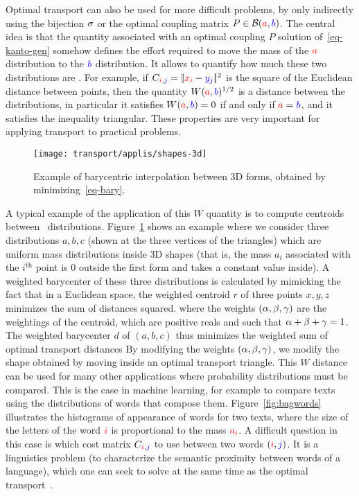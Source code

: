 Optimal transport can also be used for more difficult problems, by only indirectly using the bijection $\sigma$ or the optimal coupling matrix $P \in \mathcal{B}({\color{red}a},{\color{blue}b})$. The central idea is that the quantity associated with an optimal coupling $P$ solution of~\eqref{eq-kanto-gen}
somehow defines the effort required to move the mass of the ${\color{red}a}$ distribution to the ${\color{blue}b}$ distribution. It allows to quantify how much these two distributions are . For example, if $C_{{\color{red}i},{\color{blue}j}} = |\!| {\color{red}x_i} - {\color{blue}y_j} |\!|^2$ is the square of the Euclidean distance between points, then the quantity $W ({\color{red}a}, {\color{blue}b})^{1/2}$ is a distance between the distributions, in particular it satisfies $W({\color{red}a}, {\color{blue}b}) = 0$ if and only if ${\color{red}a} = {\color{blue}b}$, and it satisfies the inequality triangular. These properties are very important for applying transport to practical problems.


\begin{figure}\centering
        \texttt{[image: transport/applis/shapes-3d]}
    \caption{\label{fig:barycenters} Example of barycentric interpolation between 3D forms, obtained by minimizing~\eqref{eq-bary}.  }
\end{figure}

A typical example of the application of this $W$ quantity is to compute centroids between~\cite{agueh2011barycenters} distributions. Figure~\ref{fig:barycenters} shows an example where we consider three distributions $a, b, c$ (shown at the three vertices of the triangles) which are uniform mass distributions inside 3D shapes (that is, the mass $a_i$ associated with the $i^{\text{th}}$ point is 0 outside the first form and takes a constant value inside).
%
A weighted barycenter of these three distributions is calculated by mimicking the fact that in a Euclidean space, the weighted centroid $r$ of three points $x, y, z$ minimizes the sum of distances squared.
where the weights $(\alpha, \beta, \gamma)$ are the weightings of the centroid, which are positive reals and such that $\alpha + \beta + \gamma = 1$.
%
The weighted barycenter $d$ of $(a, b, c)$ thus minimizes the weighted sum of optimal transport distances
By modifying the weights $(\alpha, \beta, \gamma)$, we modify the shape obtained by moving inside an optimal transport triangle.
%
This $W$ distance can be used for many other applications where probability distributions must be compared. This is the case in machine learning, for example to compare texts using the distributions of words that compose them. Figure~\ref{fig:bagwords} illustrates the  histograms of appearance of words for two texts, where the size of the letters of the word ${\color{red}i}$ is proportional to the mass ${\color{red}a}_{\color{red}i}$. A difficult question in this case is which cost matrix $C_{{\color{red}i}, {\color{blue}j}}$ to use between two words $({\color{red}i}, {\color{blue}j})$. It is a linguistics problem (to characterize the semantic proximity between words of a language), which one can seek to solve at the same time as the optimal transport~\cite{huang2016supervised}.

